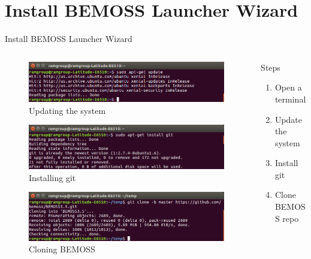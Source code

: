 \documentclass{beamer}
\begin{document}
\section{Install BEMOSS Launcher Wizard}

\begin{frame}{Install BEMOSS Launcher Wizard}{}
\begin{columns}[T]
	\begin{column}{0.5\textwidth}
		\begin{figure}
			\includegraphics[scale=0.2]{../figs/aptgetUpdate.png}
			\caption{Updating the system}
		\end{figure}
		\begin{figure}
			\includegraphics[scale=0.2]{../figs/installgit.png}
			\caption{Installing git}
		\end{figure}
		\begin{figure}
			\includegraphics[scale=0.2]{../figs/clonebemoss.png}
			\caption{Cloning BEMOSS}
		\end{figure}
	\end{column}	
	\begin{column}{0.5\textwidth}
		\begin{block}{Steps}
			\begin{enumerate}
				\item Open a terminal
				\item Update the system
				\item Install git
				\item Clone BEMOSS repo
			\end{enumerate}
		\end{block}
	\end{column}
\end{columns}
\end{frame}
\end{document}
